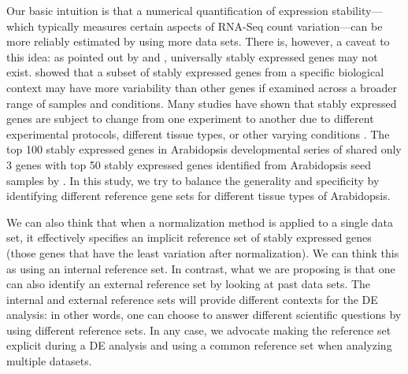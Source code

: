 \documentclass[letterpaper,12pt]{article}
\begin{document}
Our basic intuition is that a numerical quantification of expression
stability---which typically measures certain aspects of RNA-Seq count
variation---can be more reliably estimated by using more data sets.  There is,
however, a caveat to this idea: as pointed out by \cite{fernandes2008selection} and \cite{hruz2011refgenes},
universally stably expressed genes may not exist. \cite{hruz2011refgenes} showed that a subset of stably
expressed genes from a specific biological context may have more variability
than other genes if examined across a broader range of samples and conditions.
Many studies have shown that stably expressed genes are subject to change from
one experiment to another due to different experimental protocols, different
tissue types, or other varying conditions \citep{reid2006optimized,
hong2010identification}.  The top 100 stably expressed genes in Arabidopsis
developmental series of \citet{czechowski2005genome} shared only 3 genes with
top 50 stably expressed genes identified from Arabidopsis seed samples by
\citet{dekkers2012identification}.  In this study, we try to balance the
generality and specificity by identifying different reference gene sets for
different tissue types of Arabidopsis. 



We can also think that when a normalization method is applied to a single data
set, it effectively specifies an implicit reference set of stably expressed
genes (those genes that have the least variation after normalization). We can think
this as using an internal reference set. In contrast, what we are proposing is
that one can also identify an external reference set by looking at past data
sets. The internal and external reference sets will provide different contexts
for the DE analysis: in other words, one can choose to answer different
scientific questions by using different reference sets. In any case, we
advocate  making the reference set explicit during a DE analysis and using a
common reference set when analyzing multiple datasets. 

\end{document}
